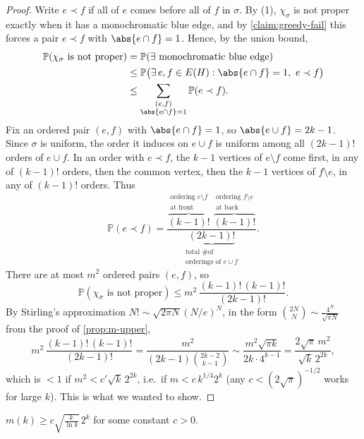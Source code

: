 \begin{proof}
    Write \(e \prec f\) if all of \(e\) comes before all of \(f\) in \(\sigma\). By (1), \(\chi_\sigma\) is not proper exactly when it has a monochromatic blue edge, and by \autoref{claim:greedy-fail} this forces a pair \(e \prec f\) with \(\abs{e \cap f} = 1\). Hence, by the union bound,
    \begin{align*}
        \mathbb{P}(\chi_\sigma \text{ is not proper})
        &= \mathbb{P}(\exists \text{ monochromatic blue edge}) \\
        &\le \mathbb{P}\bigl( \exists\, e, f \in E(H) : \abs{e \cap f} = 1,\ e \prec f \bigr) \\
        &\le \sum_{\substack{(e, f) \\ \abs{e \cap f} = 1}} \mathbb{P}(e \prec f).
    \end{align*}
    Fix an ordered pair \((e, f)\) with \(\abs{e \cap f} = 1\), so \(\abs{e \cup f} = 2k - 1\). Since \(\sigma\) is uniform, the order it induces on \(e \cup f\) is uniform among all \((2k-1)!\) orders of \(e \cup f\). In an order with \(e \prec f\), the \(k - 1\) vertices of \(e \setminus f\) come first, in any of \((k-1)!\) orders, then the common vertex, then the \(k - 1\) vertices of \(f \setminus e\), in any of \((k-1)!\) orders. Thus
    \[
        \mathbb{P}(e \prec f) = \frac{\overbrace{(k-1)!}^{\substack{\text{ordering } e \setminus f \\ \text{at front}}} \; \overbrace{(k-1)!}^{\substack{\text{ordering } f \setminus e \\ \text{at back}}}}{\underbrace{(2k-1)!}_{\substack{\text{total \# of} \\ \text{orderings of } e \cup f}}}.
    \]
    There are at most \(m^2\) ordered pairs \((e, f)\), so
    \[
        \mathbb{P}(\chi_\sigma \text{ is not proper}) \le m^2 \, \frac{(k-1)! \, (k-1)!}{(2k-1)!}.
    \]
    By Stirling's approximation \(N! \sim \sqrt{2\pi N} (N/e)^N\), in the form \(\binom{2N}{N} \sim \frac{4^N}{\sqrt{\pi N}}\) from the proof of \autoref{prop:m-upper},
    \[
        m^2 \, \frac{(k-1)! \, (k-1)!}{(2k-1)!} = \frac{m^2}{(2k-1) \binom{2k-2}{k-1}} \sim \frac{m^2 \sqrt{\pi k}}{2k \cdot 4^{k-1}} = \frac{2\sqrt{\pi} \, m^2}{\sqrt{k} \, 2^{2k}},
    \]
    which is \(< 1\) if \(m^2 < c' \sqrt{k} \, 2^{2k}\), i.e.\ if \(m < c \, k^{1/4} 2^k\) (any \(c < (2\sqrt{\pi})^{-1/2}\) works for large \(k\)). This is what we wanted to show.
\end{proof}

\begin{theorem}
    \(m(k) \ge c \sqrt{\frac{k}{\ln k}} \, 2^k\) for some constant \(c > 0\).
\end{theorem}

